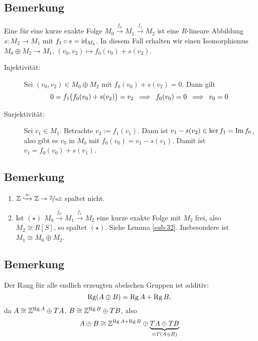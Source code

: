 \subsection[Bemerkung: Spaltung einer kurzen exakten Sequenz]{Bemerkung} %
\label{sub:45}
Eine  für eine kurze exakte Folge $M_0 \xrightarrow{f_0} M_1 \xrightarrow{f_1} M_2$ ist eine $R$-lineare Abbildung $s : M_2 \to M_1$ mit $f_1 \circ s = \id_{M_2}$. In diesem Fall erhalten wir einen Isomorphismus $M_0 \oplus M_2 \to M_1$, $(v_0, v_2) \mapsto f_0(v_0) + s(v_2)$.
\begin{description}
	\item[Injektivität:] Sei $(v_0,v_2) \in M_0 \oplus M_2$ mit $f_0(v_0) + s(v_2) =0$. Dann gilt
	\[
		0 = f_1 \enbrace[\big]{f_0(v_0) + s(v_2)} = v_2 \enspace \Longrightarrow \enspace f_0(v_0)=0 \enspace\Longrightarrow \enspace v_0 =0
	\]
	\item[Surjektivität:] Sei $v_1 \in M_1$. Betrachte $v_2 := f_1(v_1)$. Dann ist $v_1 -s(v_2) \in \ker f_1 = \im f_0$, also gibt es $v_0$ in $M_0$ mit
	$f_0(v_0) = v_1 - s(v_1)$. Damit ist $v_1= f_0(v_0)+ s(v_1)$.
\end{description}

\subsection[Bemerkung: Existenz einer Spaltung, wenn $M_2$ frei ist]{Bemerkung} %
\label{sub:46}
\begin{enumerate}[1)]
	\item $\mathds{Z} \xhookrightarrow{n \cdot } \mathds{Z} \twoheadrightarrow \nicefrac{\mathds{Z}}{n \mathds{Z}}$ spaltet nicht.
	\item Ist $(\star)$ $M_0 \xrightarrow{f_0} M_1 \xrightarrow{f_1} M_2$ eine kurze exakte Folge mit $M_2$ frei, also $M_2 \cong R[S]$, so spaltet $(\star)$.
	Siehe Lemma \ref{sub:32}. Insbesondere ist $M_1 \cong M_0 \oplus M_2$.
\end{enumerate}

\subsection[Bemerkung: Der Rang ist additiv]{Bemerkung} %
\label{sub:47}
Der Rang für alle endlich erzeugten abelschen Gruppen ist additiv:
\[
	\Rg(A \oplus B) =\Rg A + \Rg B,
\]
da $A \cong \mathds{Z}^{\Rg A} \oplus T A$, $B \cong \mathds{Z}^{\Rg B} \oplus TB$, also 
\[
	A \oplus B \cong \mathds{Z}^{\Rg A + \Rg B} \oplus \underbrace{T A \oplus T B}_{=T(A \oplus B)}
\]

